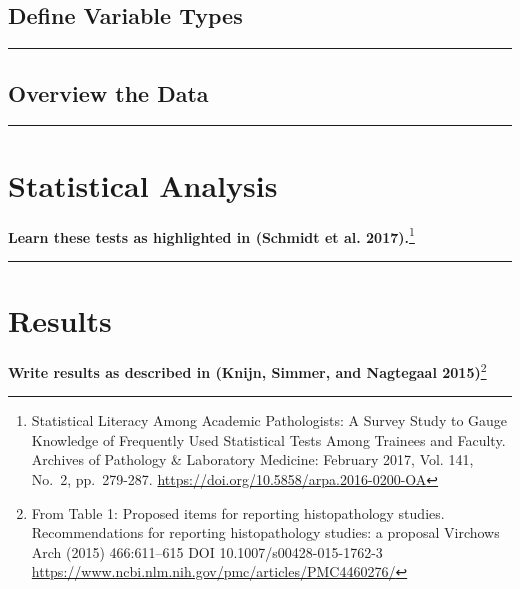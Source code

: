 \documentclass[
]{article}
\begin{document}
\hypertarget{define-variable-types}{%
\subsection{Define Variable Types}\label{define-variable-types}}

\begin{center}\rule{0.5\linewidth}{0.5pt}\end{center}

\hypertarget{overview-the-data}{%
\subsection{Overview the Data}\label{overview-the-data}}

\begin{center}\rule{0.5\linewidth}{0.5pt}\end{center}

\hypertarget{statistical-analysis}{%
\section{Statistical Analysis}\label{statistical-analysis}}

\textbf{Learn these tests as highlighted in (Schmidt et al.
2017).}\footnote{Statistical Literacy Among Academic Pathologists: A
  Survey Study to Gauge Knowledge of Frequently Used Statistical Tests
  Among Trainees and Faculty. Archives of Pathology \& Laboratory
  Medicine: February 2017, Vol. 141, No.~2, pp.~279-287.
  \url{https://doi.org/10.5858/arpa.2016-0200-OA}}

\begin{center}\rule{0.5\linewidth}{0.5pt}\end{center}

\hypertarget{results}{%
\section{Results}\label{results}}

\textbf{Write results as described in (Knijn, Simmer, and Nagtegaal
2015)}\footnote{From Table 1: Proposed items for reporting
  histopathology studies. Recommendations for reporting histopathology
  studies: a proposal Virchows Arch (2015) 466:611--615 DOI
  10.1007/s00428-015-1762-3
  \url{https://www.ncbi.nlm.nih.gov/pmc/articles/PMC4460276/}}
\end{document}
